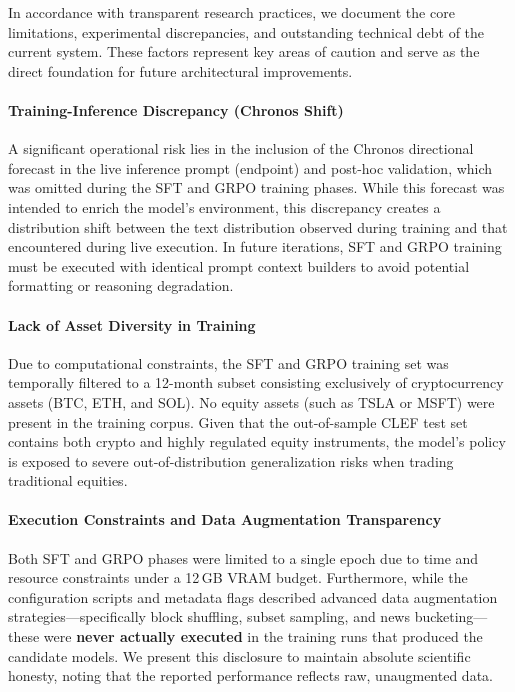     In accordance with transparent research practices, we document the core limitations, experimental discrepancies, and outstanding technical debt of the current system. These factors represent key areas of caution and serve as the direct foundation for future architectural improvements.

    \paragraph{Training-Inference Discrepancy (Chronos Shift)}
    A significant operational risk lies in the inclusion of the Chronos directional forecast in the live inference prompt (endpoint) and post-hoc validation, which was omitted during the SFT and GRPO training phases. While this forecast was intended to enrich the model's environment, this discrepancy creates a distribution shift between the text distribution observed during training and that encountered during live execution. In future iterations, SFT and GRPO training must be executed with identical prompt context builders to avoid potential formatting or reasoning degradation.

    \paragraph{Lack of Asset Diversity in Training}
    Due to computational constraints, the SFT and GRPO training set was temporally filtered to a 12-month subset consisting exclusively of cryptocurrency assets (BTC, ETH, and SOL). No equity assets (such as TSLA or MSFT) were present in the training corpus. Given that the out-of-sample CLEF test set contains both crypto and highly regulated equity instruments, the model's policy is exposed to severe out-of-distribution generalization risks when trading traditional equities.

    \paragraph{Execution Constraints and Data Augmentation Transparency}
    Both SFT and GRPO phases were limited to a single epoch due to time and resource constraints under a 12\,GB VRAM budget. Furthermore, while the configuration scripts and metadata flags described advanced data augmentation strategies—specifically block shuffling, subset sampling, and news bucketing—these were \textbf{never actually executed} in the training runs that produced the candidate models. We present this disclosure to maintain absolute scientific honesty, noting that the reported performance reflects raw, unaugmented data.

